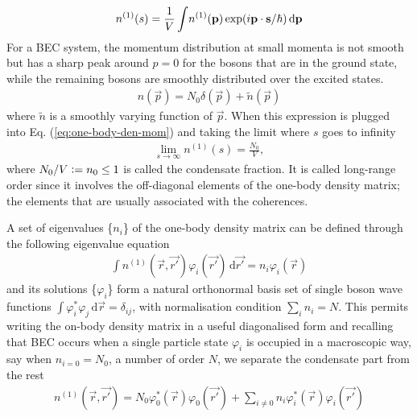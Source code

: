 			\begin{align}
				n^{(1)}(s) = \frac{1}{V}\int \! n^{(1)}\qty(\bm{\mathrm{p}})\exp(i\bm{\mathrm{p}}\cdot\bm{\mathrm{s}}/\hbar)\,\mathrm{d}\bm{\mathrm{p}} \label{eq:one-body-den-mom}
			\end{align}
			For a BEC system, the momentum distribution at small momenta is not smooth but has a sharp peak around $p=0$ for the bosons that are in the ground state, while the remaining bosons are smoothly distributed over the excited states.
			\begin{align}
				n(\vec{p})=N_0\delta(\vec{p})+\tilde{n}(\vec{p})
			\end{align}
			where $\tilde{n}$ is a smoothly varying function of $\vec{p}$. When this expression is plugged into Eq. (\ref{eq:one-body-den-mom}) and taking the limit where $s$ goes to infinity
			\begin{align}
				\lim_{s\rightarrow\infty}n^{(1)}(s)=\frac{N_0}{V},
			\end{align}
			where $N_0/V \vcentcolon= n_0\leq 1$ is called the condensate fraction. It is called long-range order since it involves the off-diagonal elements of the one-body density matrix; the elements that are usually associated with the coherences.
			
			A set of eigenvalues \{$n_i$\} of the one-body density matrix can be defined through the following eigenvalue equation
			\begin{align}
				\int \! n^{(1)}(\vec{r},\vec{r'})\varphi_i(\vec{r'}) \,\mathrm{d}\vec{r'} = n_i\varphi_i(\vec{r})
			\end{align}
			and its solutions \{$\varphi_i$\} form a natural orthonormal basis set of single boson wave functions $\int\!\varphi_i^*\varphi_j\,\mathrm{d}\vec{r}=\delta_{ij}$, with normalisation condition $\sum_i n_i=N$. This permits writing the on-body density matrix in a useful diagonalised form and recalling that BEC occurs when a single particle state $\varphi_i$ is occupied in a macroscopic way, say when $n_{i=0}=N_0$, a number of order $N$, we separate the condensate part from the rest
			\begin{align}
				n^{(1)}(\vec{r},\vec{r'}) = N_0\varphi_0^*(\vec{r})\varphi_0(\vec{r'})+\sum_{i\neq0}n_i\varphi_i^*(\vec{r})\varphi_i(\vec{r'}) \label{eq:obdm-diag}
			\end{align}

